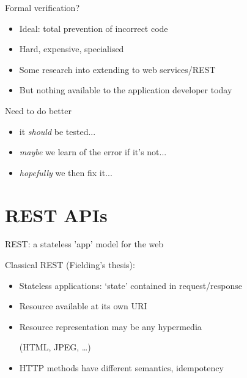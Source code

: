 \documentclass[10pt]{beamer}
\begin{document}
\begin{frame}{Formal verification?}

    \begin{itemize}[<+->]
        \item Ideal: total prevention of incorrect code
        \item Hard, expensive, specialised
        \item Some research into extending to web services/REST
        \item But nothing available to the application developer today
    \end{itemize}

\end{frame}

\begin{frame}{Need to do better}

    \begin{itemize}[<+->]
        \item it \emph{should} be tested...
        \item \emph{maybe} we learn of the error if it's not...
        \item \emph{hopefully} we then fix it...
    \end{itemize}
    

\end{frame}

\section[REpresentational State Transfer]{REST APIs}

\begin{frame}{REST: a stateless 'app' model for the web}

    Classical REST (Fielding's thesis):
     \begin{itemize}[<+->]
        \item Stateless applications: `state' contained in request/response
        \item \alert{Resource} available at its own URI
        \item Resource \alert{representation} may be any hypermedia
            \begin{small}(HTML, JPEG, \dots)\end{small}
        \item HTTP methods have different semantics, idempotency
    \end{itemize}

\end{frame}
\end{document}
